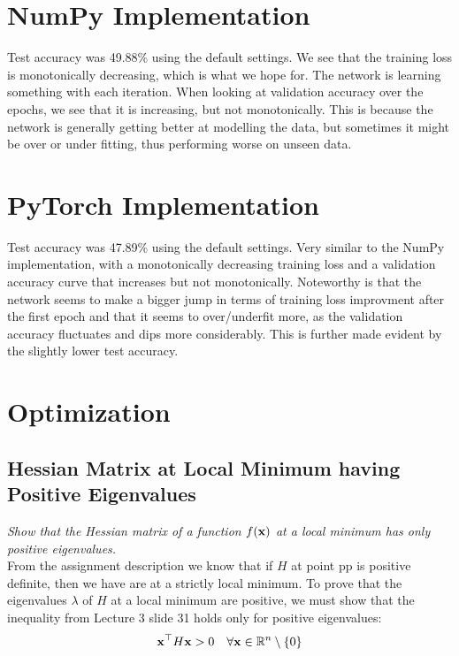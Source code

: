 \documentclass[a4paper]{article}
\begin{document}
\section{NumPy Implementation}
Test accuracy was 49.88\% using the default settings.
We see that the training loss is monotonically decreasing, which is what we hope for. The network is learning something with each
iteration. When looking at validation accuracy over the epochs, we see that it is increasing, but not monotonically. This is because
the network is generally getting better at modelling the data, but sometimes it might be over or under fitting, thus performing worse
on unseen data.

\section{PyTorch Implementation}
Test accuracy was 47.89\% using the default settings.
Very similar to the NumPy implementation, with a monotonically decreasing training loss and a validation accuracy curve that increases
but not monotonically. Noteworthy is that the network seems to make a bigger jump in terms of training loss improvment after the first
epoch and that it seems to over/underfit more, as the validation accuracy fluctuates and dips more considerably. This is further
made evident by the slightly lower test accuracy.
\bigskip

\section{Optimization}
\subsection{Hessian Matrix at Local Minimum having Positive Eigenvalues}
\textit{Show that the Hessian matrix of a function $f(\mathbf{x})$ at a local minimum has only positive eigenvalues.}\\
From the assignment description we know that if $H$ at point pp is positive definite, then we have are at a strictly
local minimum. To prove that the eigenvalues $\lambda$ of $H$ at a local minimum are positive, we must show that
the inequality from Lecture 3 slide 31 holds only for positive eigenvalues:
\begin{align}
   \mathbf{x}^{\top} H \mathbf{x} > 0 \quad \forall \mathbf{x} \in \mathbb{R}^n \setminus \{0\}
\end{align}
\end{document}
